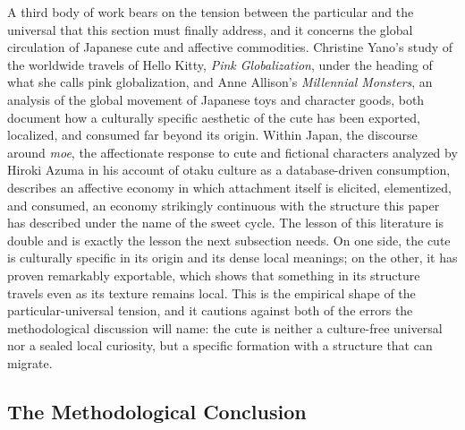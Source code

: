 A third body of work bears on the tension between the particular and the universal that this section must finally address, and it concerns the global circulation of Japanese cute and affective commodities. Christine Yano's study of the worldwide travels of Hello Kitty, \textit{Pink Globalization}, under the heading of what she calls pink globalization, and Anne Allison's \textit{Millennial Monsters}, an analysis of the global movement of Japanese toys and character goods, both document how a culturally specific aesthetic of the cute has been exported, localized, and consumed far beyond its origin. Within Japan, the discourse around \textit{moe}, the affectionate response to cute and fictional characters analyzed by Hiroki Azuma in his account of otaku culture as a database-driven consumption, describes an affective economy in which attachment itself is elicited, elementized, and consumed, an economy strikingly continuous with the structure this paper has described under the name of the sweet cycle. The lesson of this literature is double and is exactly the lesson the next subsection needs. On one side, the cute is culturally specific in its origin and its dense local meanings; on the other, it has proven remarkably exportable, which shows that something in its structure travels even as its texture remains local. This is the empirical shape of the particular-universal tension, and it cautions against both of the errors the methodological discussion will name: the cute is neither a culture-free universal nor a sealed local curiosity, but a specific formation with a structure that can migrate.

\subsection{The Methodological Conclusion}

